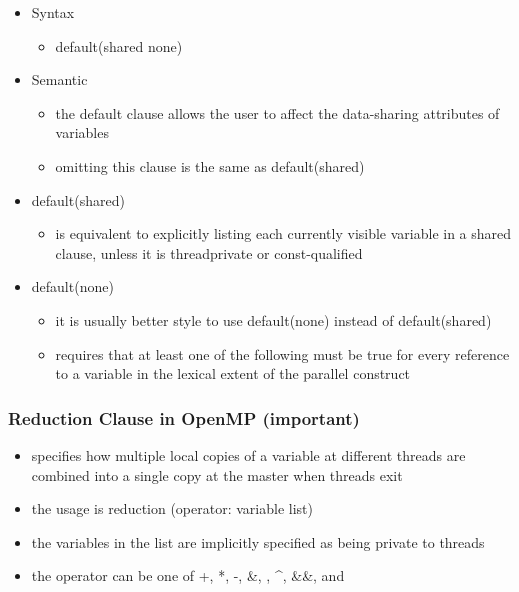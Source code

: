 \begin{itemize}
\tightlist
\item
  Syntax

  \begin{itemize}
  \tightlist
  \item
    default(shared \textbar{} none)
  \end{itemize}
\item
  Semantic

  \begin{itemize}
  \tightlist
  \item
    the default clause allows the user to affect the data-sharing
    attributes of variables
  \item
    omitting this clause is the same as default(shared)
  \end{itemize}
\item
  default(shared)

  \begin{itemize}
  \tightlist
  \item
    is equivalent to explicitly listing each currently visible variable
    in a shared clause, unless it is threadprivate or const-qualified
  \end{itemize}
\item
  default(none)

  \begin{itemize}
  \tightlist
  \item
    it is usually better style to use default(none) instead of
    default(shared)
  \item
    requires that at least one of the following must be true for every
    reference to a variable in the lexical extent of the parallel
    construct
  \end{itemize}
\end{itemize}

\clearpage
\hypertarget{reduction-clause-in-openmp-important}{%
\subsubsection{Reduction Clause in OpenMP
(important)}\label{reduction-clause-in-openmp-important}}

\begin{itemize}
\tightlist
\item
  specifies how multiple local copies of a variable at different threads
  are combined into a single copy at the master when threads exit
\item
  the usage is reduction (operator: variable list)
\item
  the variables in the list are implicitly specified as being private to
  threads
\item
  the operator can be one of +, *, -, \&, \textbar{}, \^{}, \&\&, and
  \textbar{}\textbar{}
\end{itemize}

